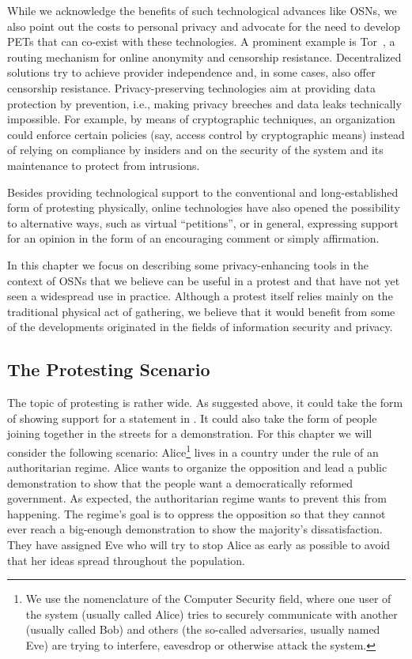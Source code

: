 While we acknowledge the benefits of such technological advances like
\acp{OSN}, we also point out the costs to personal privacy and
advocate for the need to develop \acp{PET} that can co-exist with
these technologies. A prominent example is Tor~\cite{Tor}, a routing
mechanism for online anonymity and censorship
resistance. Decentralized solutions try to achieve provider
independence and, in some cases, also offer censorship
resistance. Privacy-preserving technologies aim at providing data
protection by prevention, i.e., making privacy breeches and data leaks
technically impossible. For example, by means of cryptographic
techniques, an organization could enforce certain policies (say,
access control by cryptographic means) instead of relying on
compliance by insiders and on the security of the system and its
maintenance to protect from
intrusions. %

Besides providing technological support to the conventional and
long-established form of protesting physically, online technologies
have also opened the possibility to alternative ways, such as virtual
\enquote{petitions}, or in general, expressing support for an opinion
in the form of an encouraging comment or simply affirmation.

In this chapter we focus on describing some privacy-enhancing tools in
the context of \acp{OSN} that we believe can be useful in a protest
and that have not yet seen a widespread use in practice. Although a
protest itself relies mainly on the traditional physical act of
gathering, we believe that it would benefit from some of the
developments originated in the fields of information security and
privacy.

\subsection{The Protesting Scenario}

The topic of protesting is rather wide.
As suggested above, it could take the form of showing support for a statement 
in .
It could also take the form of people joining together in the streets for 
a demonstration.
For this chapter we will consider the following scenario:
Alice\footnote{%
  We use the nomenclature of the Computer Security field,
  where one user of the system (usually called Alice) tries to securely communicate
  with another (usually called Bob) and others (the so-called adversaries, usually
  named Eve) are trying to interfere, eavesdrop or otherwise attack the
  system. 

} lives in a country under the rule of an authoritarian regime.
Alice wants to organize the opposition and lead a public demonstration to show 
that the people want a democratically reformed government.
As expected, the authoritarian regime wants to prevent this from happening.
The regime's goal is to oppress the opposition so that they cannot ever reach 
a big-enough demonstration to show the majority's dissatisfaction.
They have assigned Eve who will try to stop Alice as early as possible to avoid 
that her ideas spread throughout the population.

